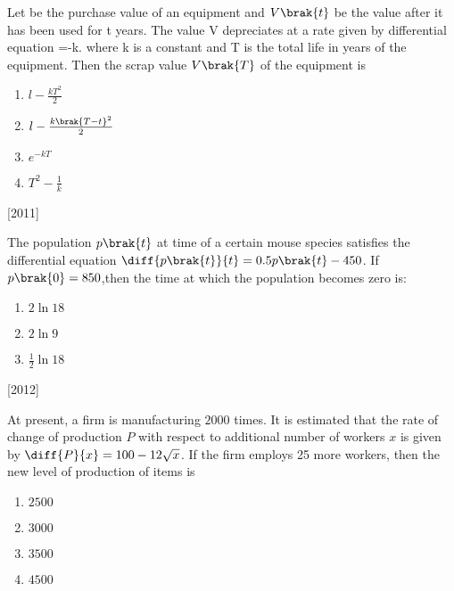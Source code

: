 \item Let be the purchase value of an equipment and $V\brak{t}$ be the value after it has been used for t years. The value V depreciates at a rate given by differential equation =-k. where k is a constant and T is the total life in years of the equipment. Then the scrap value $V\brak{T}$ of the equipment is 
\begin{multicols}{2}
 \begin {enumerate}

    \item $ l -\frac{kT^2}{2}$
    \item $ l - \frac{k\brak{T-t}^2}{2}$
    \item $ e^{-kT}$
    \item $ T^2-\frac{1}{k}$

 \end{enumerate}
\end{multicols}
\hfill
{[2011]}

\item The population $p\brak{t}$ at time of a certain mouse species satisfies the differential equation $\diff{p\brak{t}}{t}= 0.5p\brak{t}- 450$. If $p\brak{0}=850$,then the time at which the population becomes zero is:
\begin{multicols}{2}
 \begin{enumerate}
    \item $ 2\ln{18}$
    \item $ 2\ln{9}$
    \item $ \frac{1}{2}\ln{18}$
 \end{enumerate}
\end{multicols}
\hfill
{[2012]}

\item At present, a firm is manufacturing $2000$ times. It is estimated that the rate of change of production $P$ with respect to additional number of workers $x$ is given by $\diff{P}{x}=100-12\sqrt{x}$. If the firm employs 25 more workers, then the new level of production of items is

\begin{multicols}{2}
    

 \begin{enumerate}

    \item $2500$
    \item$3000$
    \item$3500$
    \item$4500$
 \end{enumerate}
\end{multicols}

